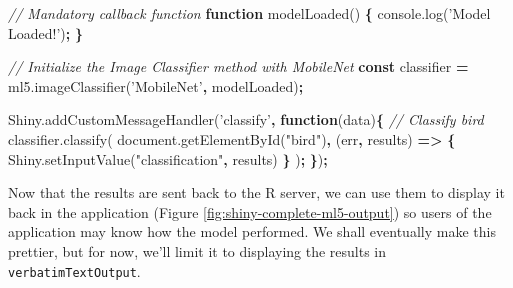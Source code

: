 \documentclass[10pt,]{krantz}
\makeatletter
\newenvironment{Shaded}{\begin{snugshade}}{\end{snugshade}}
\newcommand{\AttributeTok}[1]{\textcolor[rgb]{0.61,0.61,0.61}{#1}}
\newcommand{\CommentTok}[1]{\textcolor[rgb]{0.37,0.37,0.37}{\textit{#1}}}
\newcommand{\KeywordTok}[1]{\textcolor[rgb]{0.27,0.27,0.27}{\textbf{#1}}}
\newcommand{\NormalTok}[1]{#1}
\newcommand{\OperatorTok}[1]{\textcolor[rgb]{0.43,0.43,0.43}{\textbf{#1}}}
\newcommand{\StringTok}[1]{\textcolor[rgb]{0.5,0.5,0.5}{#1}}
\newcommand{\VariableTok}[1]{\textcolor[rgb]{0,0,0}{#1}}
\newenvironment{kframe}{%
\medskip{}
\setlength{\fboxsep}{.8em}
 \def\at@end@of@kframe{}%
 \ifinner\ifhmode%
  \def\at@end@of@kframe{\end{minipage}}%
  \begin{minipage}{\columnwidth}%
 \fi\fi%
 \def\FrameCommand##1{\hskip\@totalleftmargin \hskip-\fboxsep
 \colorbox{shadecolor}{##1}\hskip-\fboxsep
     \hskip-\linewidth \hskip-\@totalleftmargin \hskip\columnwidth}%
 \MakeFramed {\advance\hsize-\width
   \@totalleftmargin\z@ \linewidth\hsize
   \@setminipage}}%
 {\par\unskip\endMakeFramed%
 \at@end@of@kframe}
\renewenvironment{Shaded}{\begin{kframe}}{\end{kframe}}
\makeatother
\begin{document}
\begin{Shaded}
\begin{Highlighting}[]
\CommentTok{// Mandatory callback function}
\KeywordTok{function} \AttributeTok{modelLoaded}\NormalTok{() }\OperatorTok{\{}
  \VariableTok{console}\NormalTok{.}\AttributeTok{log}\NormalTok{(}\StringTok{'Model Loaded!'}\NormalTok{)}\OperatorTok{;}
\OperatorTok{\}}

\CommentTok{// Initialize the Image Classifier method with MobileNet}
\KeywordTok{const}\NormalTok{ classifier }\OperatorTok{=} \VariableTok{ml5}\NormalTok{.}\AttributeTok{imageClassifier}\NormalTok{(}\StringTok{'MobileNet'}\OperatorTok{,}\NormalTok{ modelLoaded)}\OperatorTok{;}

\VariableTok{Shiny}\NormalTok{.}\AttributeTok{addCustomMessageHandler}\NormalTok{(}\StringTok{'classify'}\OperatorTok{,} \KeywordTok{function}\NormalTok{(data)}\OperatorTok{\{}
  \CommentTok{// Classify bird}
  \VariableTok{classifier}\NormalTok{.}\AttributeTok{classify}\NormalTok{(}
    \VariableTok{document}\NormalTok{.}\AttributeTok{getElementById}\NormalTok{(}\StringTok{"bird"}\NormalTok{)}\OperatorTok{,}\NormalTok{ (err}\OperatorTok{,}\NormalTok{ results) }\KeywordTok{=>} \OperatorTok{\{}
      \VariableTok{Shiny}\NormalTok{.}\AttributeTok{setInputValue}\NormalTok{(}\StringTok{"classification"}\OperatorTok{,}\NormalTok{ results)}
    \OperatorTok{\}}
\NormalTok{  )}\OperatorTok{;}
\OperatorTok{\}}\NormalTok{)}\OperatorTok{;}
\end{Highlighting}
\end{Shaded}

Now that the results are sent back to the R server, we can use them to display it back in the application (Figure \ref{fig:shiny-complete-ml5-output}) so users of the application may know how the model performed. We shall eventually make this prettier, but for now, we'll limit it to displaying the results in \texttt{verbatimTextOutput}.
\end{document}
